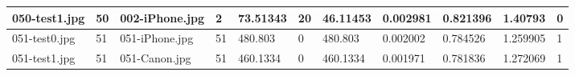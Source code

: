 \begin{landscape}
\begin{longtable}{|p{2cm}|p{1cm}|p{2cm}|p{1cm}|p{2cm}|p{1cm}|p{2cm}|p{2cm}|p{2cm}|p{2cm}|p{1cm}|}
		050-test1.jpg   & 50               & 002-iPhone.jpg        & 2                           & 73.51343              & 20                      & 46.11453                   & 0.002981              & 0.821396              & 1.40793                  & 0                \\ \hline
		051-test0.jpg   & 51               & 051-iPhone.jpg        & 51                          & 480.803               & 0                       & 480.803                    & 0.002002              & 0.784526              & 1.259905                 & 1                \\ \hline
		051-test1.jpg   & 51               & 051-Canon.jpg         & 51                          & 460.1334              & 0                       & 460.1334                   & 0.001971              & 0.781836              & 1.272069                 & 1                \\ \hline
	\end{longtable}
\end{landscape}

